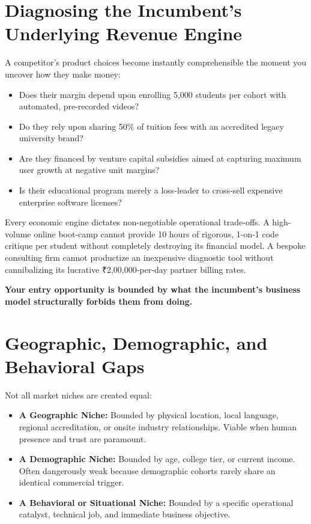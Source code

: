 \section{Diagnosing the Incumbent's Underlying Revenue Engine}

A competitor's product choices become instantly comprehensible the moment you uncover how they make money:
\begin{itemize}[leftmargin=12pt,itemsep=1pt,topsep=1pt]
  \item Does their margin depend upon enrolling 5,000 students per cohort with automated, pre-recorded videos?
  \item Do they rely upon sharing 50\% of tuition fees with an accredited legacy university brand?
  \item Are they financed by venture capital subsidies aimed at capturing maximum user growth at negative unit margins?
  \item Is their educational program merely a loss-leader to cross-sell expensive enterprise software licenses?
\end{itemize}

Every economic engine dictates non-negotiable operational trade-offs. A high-volume online boot-camp cannot provide 10 hours of rigorous, 1-on-1 code critique per student without completely destroying its financial model. A bespoke consulting firm cannot productize an inexpensive diagnostic tool without cannibalizing its lucrative ₹2,00,000-per-day partner billing rates.

\textbf{Your entry opportunity is bounded by what the incumbent's business model structurally forbids them from doing.}

\section{Geographic, Demographic, and Behavioral Gaps}

Not all market niches are created equal:
\begin{itemize}[leftmargin=12pt,itemsep=2pt,topsep=1pt]
  \item \textbf{A Geographic Niche:} Bounded by physical location, local language, regional accreditation, or onsite industry relationships. Viable when human presence and trust are paramount.
  \item \textbf{A Demographic Niche:} Bounded by age, college tier, or current income. Often dangerously weak because demographic cohorts rarely share an identical commercial trigger.
  \item \textbf{A Behavioral or Situational Niche:} Bounded by a specific operational catalyst, technical job, and immediate business objective.
\end{itemize}

